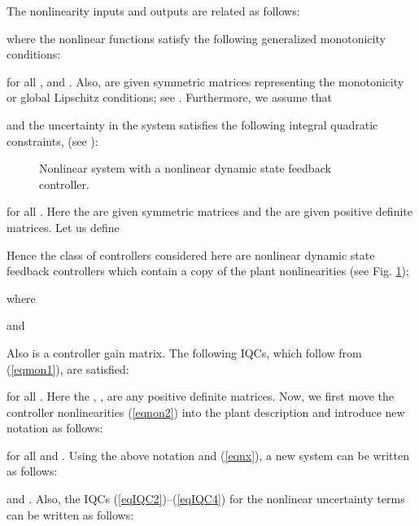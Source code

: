 \documentclass[twocolumn]{autart}
\begin{document}
The nonlinearity inputs and outputs are related as follows:

where the nonlinear functions  satisfy the following generalized monotonicity conditions:

for all ,  and . Also,  are given symmetric matrices representing the monotonicity or global Lipschitz conditions; see \cite{outputfeedback_petersen}. 
Furthermore, we assume that

and the uncertainty in the system satisfies the following integral quadratic constraints, (see \cite{IP}):
\begin{small}

\end{small}
\begin{figure}[t]
\begin{center}
\caption{Nonlinear system with a nonlinear dynamic state feedback  controller.}
\label{fig:nonlinear}
\end{center}
\end{figure}
\noindent for all . Here the  are given symmetric matrices and the  are given positive definite matrices. Let us define
\begin{small}

\end{small}

\noindent Hence the class of controllers considered here are nonlinear dynamic state feedback controllers which contain a copy of the plant nonlinearities (see Fig. \ref{fig:nonlinear});
\begin{small}

where

and

\end{small}

\noindent Also  is a controller gain matrix. 
The following IQCs, which follow from (\ref{eqmon1}), are satisfied:

for all . Here the , ,  are any positive definite matrices.  
Now, we first move the controller nonlinearities (\ref{eqnon2}) into the plant description and introduce new notation as follows:
\begin{small}

\end{small}

\noindent for all  and . Using the above notation and (\ref{eqnx}), a new system can be written as follows:

 and . Also, the IQCs (\ref{eqIQC2})--(\ref{eqIQC4}) for the nonlinear uncertainty terms can be written as follows:
\end{document}
